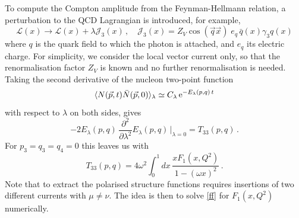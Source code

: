 To compute the Compton amplitude from the Feynman-Hellmann relation, a perturbation to the QCD Lagrangian is introduced, for example,
\begin{equation}
\mathcal{L}(x) \rightarrow \mathcal{L}(x) + \lambda \mathcal{J}_3(x)\,, \quad \mathcal{J}_3(x)=Z_V\cos(\vec{q}\vec{x})\; e_q \,\bar{q}(x)\gamma_3 q(x) 
\label{in}
\end{equation}
where $q$ is the quark field to which the photon is attached, and $e_q$ its electric charge. For simplicity, we consider the local vector current only, so that the renormalisation factor $Z_V$ is known and no further renormalisation is needed. Taking the second derivative of the nucleon two-point function 
\begin{equation}
\langle N(\vec{p},t) \bar{N}(\vec{p},0)\rangle_\lambda \simeq C_\lambda\, {\rm e}^{-E_\lambda(p,q)\,t}
\end{equation}
with respect to $\lambda$ on both sides, gives
\begin{equation}
-2 E_\lambda(p,q)\, \frac{\partial^2}{\partial\lambda^2}  E_\lambda(p,q)\,\big|_{\lambda=0} = T_{33}(p,q) \,.
\end{equation}
For $p_3=q_3=q_4=0$ this leaves us with
\begin{equation}
T_{33}(p,q) = 4 \omega^2 \int_0^1 dx\,  \frac{xF_1(x,Q^2)}{1-(\omega x)^2} \,.
\label{ff}
\end{equation}
Note that to extract the polarised structure functions requires insertions of two different currents with $\mu\neq \nu$. The idea is then to solve \eqref{ff} for $F_1(x,Q^2)$ numerically.
%

